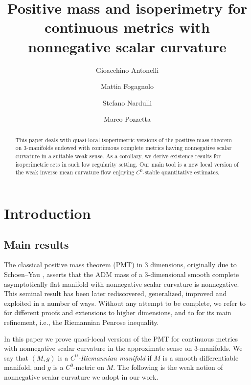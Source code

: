 \documentclass[a4paper,12pt,reqno]{amsart}
\author[G. Antonelli]{Gioacchino Antonelli}
\author[M. Fogagnolo]{Mattia Fogagnolo}
\author[S. Nardulli]{Stefano Nardulli}
\author[M. Pozzetta]{Marco Pozzetta}
\numberwithin{equation}{section}
\theoremstyle{plain}
\theoremstyle{definition}
\theoremstyle{remark}
\begin{document}
\title[Positive mass and isoperimetry for continuous metrics]{Positive mass and isoperimetry for continuous metrics with nonnegative scalar curvature}

\medskip



\begin{abstract}
This paper deals with quasi-local isoperimetric versions of the positive mass theorem on $3$-manifolds endowed with continuous complete metrics having nonnegative scalar curvature in a suitable weak sense. As a corollary, we derive existence results for isoperimetric sets in such low regularity setting. Our main tool is a new local version of the weak inverse mean curvature flow enjoying $C^0$-stable quantitative estimates.
\end{abstract}

\maketitle

\tableofcontents

\vspace{-0.7cm}

\section{Introduction}


\subsection{Main results}
The classical positive mass theorem (PMT) in $3$ dimensions, originally due to Schoen--Yau \cite{SchoenYauPMT}, asserts that the ADM mass of a $3$-dimensional smooth complete asymptotically flat manifold with nonnegative scalar curvature is nonnegative. This seminal result has been later rediscovered, generalized, improved and exploited in a number of ways.  Without any attempt to be complete, we refer to \cite{WittenPMT,  SYDefinitivePMT, AMO21, bray-karazas-khuri-stern} for different proofs and extensions to higher dimensions, and to \cite{HuiskenIlmanen, BrayPenrose} for its main refinement, i.e., the Riemannian Penrose inequality.

In this paper we prove  quasi-local versions of the PMT for continuous metrics with nonnegative scalar curvature in the approximate sense on $3$-manifolds. We say that $(M,g)$ is a \textit{$C^0$-Riemannian manifold} if $M$ is a smooth differentiable manifold, and $g$ is a $C^0$-metric on $M$.
The following is the weak notion of nonnegative scalar curvature we adopt in our work.
\end{document}
